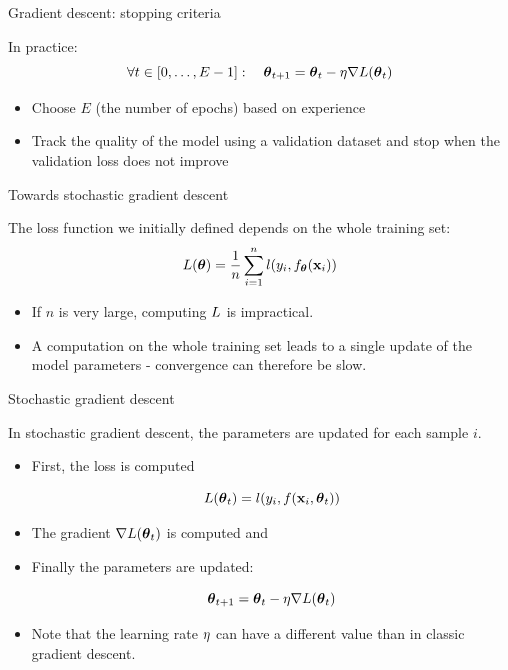 \documentclass[xcolor=pdftex,dvipsnames,table,mathserif]{beamer}
\begin{document}
\begin{frame}{Gradient descent: stopping criteria}

  In practice:
  \[
  \forall t \in [0, \ldots, E-1]:\quad \boldsymbol{\theta}_{t+1} = \boldsymbol{\theta}_t - \eta \nabla L(\boldsymbol{\theta}_t)
  \]

  \begin{itemize}
  \item Choose $E$ (the number of \alert{epochs}) based on experience
  \item Track the quality of the model using a validation dataset and stop when the validation loss does not improve
  \end{itemize}


\end{frame}
\begin{frame}{Towards stochastic gradient descent}

  The loss function we initially defined depends on the whole training set:
  \[
  L(\boldsymbol{\theta}) = \frac{1}{n} \sum\limits_{i=1}^n l(y_i, f_{\boldsymbol{\theta}}(\mathbf{x}_i))
  \]

  \pause

  \begin{itemize}[<+->]
  \item If $n$ is very large, computing $L$ is impractical.
  \item A computation on the whole training set leads to a single update of the model parameters - convergence can therefore be slow.
  \end{itemize}

\end{frame}



\begin{frame}{Stochastic gradient descent}

  In \alert{stochastic gradient descent}, the parameters are updated for each sample $i$.

  \begin{itemize}[<+->]
  \item
    First, the loss is computed

    \[
    L(\boldsymbol{\theta}_t) = l(y_i, f(\mathbf{x}_i, \boldsymbol{\theta}_t))
    \]
  \item
    The gradient $\nabla L(\boldsymbol{\theta}_t)$ is computed and
  \item Finally the parameters are updated:

    \[
    \boldsymbol{\theta}_{t+1} = \boldsymbol{\theta}_t - \eta\nabla L(\boldsymbol{\theta}_t)
    \]
  \item
    Note that the learning rate $\eta$ can have a different value than in classic gradient descent.
  \end{itemize}

\end{frame}
\end{document}
